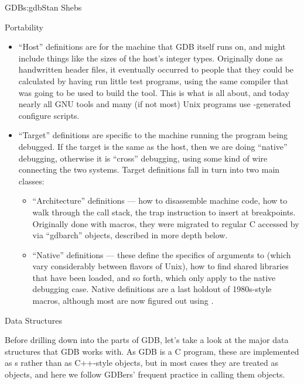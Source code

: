 \begin{aosachapter}{GDB}{s:gdb}{Stan Shebs}
\begin{aosasect1}{Portability}
\begin{itemize}
\item ``Host'' definitions are for the machine that GDB itself runs on,
and might include things like the sizes of the host's integer types.
Originally done as handwritten header files, it eventually occurred to
people that they could be calculated by having  run
little test programs, using the same compiler that was going to be
used to build the tool.  This is what
\cite{bib:autoconf} is all about, and today nearly all
GNU tools and many (if not most) Unix programs use
-generated configure scripts.

\item ``Target'' definitions are specific to the machine running the
program being debugged.  If the target is the same as the host, then
we are doing ``native'' debugging, otherwise it is ``cross''
debugging, using some kind of wire connecting the two systems.  Target
definitions fall in turn into two main classes:

\begin{itemize}
\item ``Architecture'' definitions --- how to disassemble machine code, how
to walk through the call stack, the trap instruction to insert at
breakpoints.  Originally done with macros, they were migrated to
regular C accessed by via ``gdbarch'' objects, described in more depth
below.

\item ``Native'' definitions --- these define the specifics of arguments to
 (which vary considerably between flavors of Unix), how
to find shared libraries that have been loaded, and so forth, which
only apply to the native debugging case.  Native definitions are a
last holdout of 1980s-style macros, although most are now figured out
using .
\end{itemize}
\end{itemize}

\end{aosasect1}

\begin{aosasect1}{Data Structures}

Before drilling down into the parts of GDB, let's take a look at the
major data structures that GDB works with.  As GDB is a C program,
these are implemented as s rather than as C++-style
objects, but in most cases they are treated as objects, and here we
follow GDBers' frequent practice in calling them objects.


\end{aosasect1}
\end{aosachapter}
